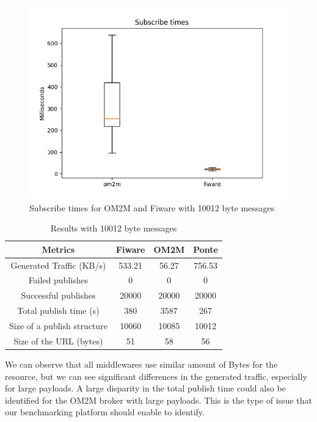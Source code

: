 \documentclass[conference]{IEEEtran}
\begin{document}
\begin{figure}[htbp!]
  \centering
  \includegraphics[width=\columnwidth]{figures/om2m_fiware_subscribe_times_10000.png}
  \caption{Subscribe times for OM2M and Fiware with 10012 byte messages}
  \label{fig:subscribe_times_10000}
\end{figure}


\begin{table}[htbp!]
  \centering
  \begin{tabular}{|c|c|c|c|}
    \hline 
    \textbf{Metrics} & \textbf{Fiware} & \textbf{OM2M} & \textbf{Ponte} \\
    \hline 
    Generated Traffic (KB/s) & 533.21 & 56.27 & 756.53 \\
    \hline 
    Failed publishes & 0 & 0 & 0 \\
    \hline 
    Successful publishes & 20000 & 20000 & 20000 \\
    \hline 
    Total publish time (s) & 380 & 3587 & 267 \\
    \hline 
    Size of a publish structure & 10060 & 10085 & 10012 \\
    \hline 
    Size of the URL (bytes) & 51 & 58 & 56 \\
    \hline 
    
  \end{tabular}
  \vspace{1mm}
  \caption{Results with 10012 byte messages}
  \label{tab:misc_metrics_all_10012}
\end{table}

We can observe that all middlewares use similar amount of Bytes for the resource, but we can see significant differences in the generated traffic, especially for large payloads. A large disparity in the total publish time could also be identified for the OM2M broker with large payloads. This is the type of issue that our benchmarking platform should enable to identify. 
\end{document}
